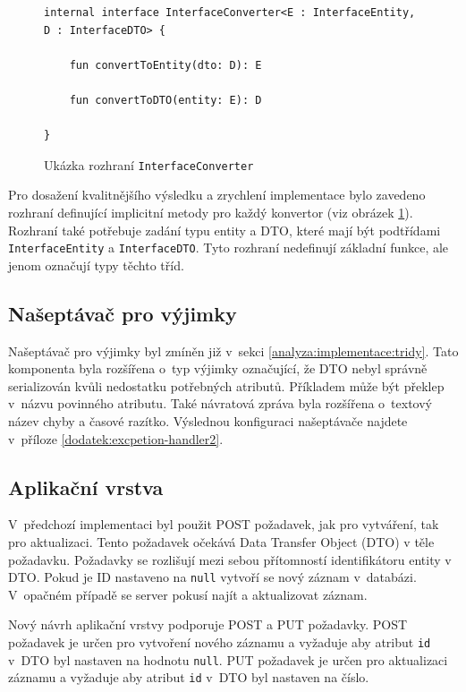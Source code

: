         
        \begin{figure} %
            \begin{verbatim}
internal interface InterfaceConverter<E : InterfaceEntity, D : InterfaceDTO> {

    fun convertToEntity(dto: D): E

    fun convertToDTO(entity: E): D

}
            \end{verbatim}
            \caption{Ukázka rozhraní \texttt{InterfaceConverter}} 
            \label{code:interface-converterl}
        \end{figure}
        Pro dosažení kvalitnějšího výsledku a zrychlení implementace bylo zavedeno rozhraní definující implicitní metody pro každý konvertor (viz obrázek \ref{code:interface-converterl}). Rozhraní také potřebuje zadání typu entity a DTO, které mají být podtřídami \verb|InterfaceEntity| a \verb|InterfaceDTO|. Tyto rozhraní nedefinují základní funkce, ale jenom označují typy těchto tříd. 
        
    \subsection{Našeptávač pro výjimky}
        Našeptávač pro výjimky byl zmíněn již v~sekci \ref{analyza:implementace:tridy}. Tato komponenta byla rozšířena o~typ výjimky označující, že DTO nebyl správně serializován kvůli nedostatku potřebných atributů. Příkladem může být překlep v~názvu povinného atributu. Také návratová zpráva byla rozšířena o~textový název chyby a časové razítko. Výslednou konfiguraci našeptávače najdete v~příloze \ref{dodatek:excpetion-handler2}.
        
    \subsection{Aplikační vrstva}
        V~předchozí implementaci byl použit POST požadavek, jak pro vytváření, tak pro aktualizaci. Tento požadavek očekává Data Transfer Object (DTO) v těle požadavku. Požadavky se rozlišují mezi sebou přítomností identifikátoru entity v DTO. Pokud je ID nastaveno na \verb|null| vytvoří se nový záznam v~databázi. V~opačném případě se server pokusí najít a aktualizovat záznam.
        
        
        Nový návrh aplikační vrstvy podporuje POST a PUT požadavky. POST požadavek je určen pro vytvoření nového záznamu a vyžaduje aby atribut \verb|id| v~DTO byl nastaven na hodnotu \verb|null|. PUT požadavek je určen pro aktualizaci záznamu a vyžaduje aby atribut \verb|id| v~DTO byl nastaven na číslo.
        
